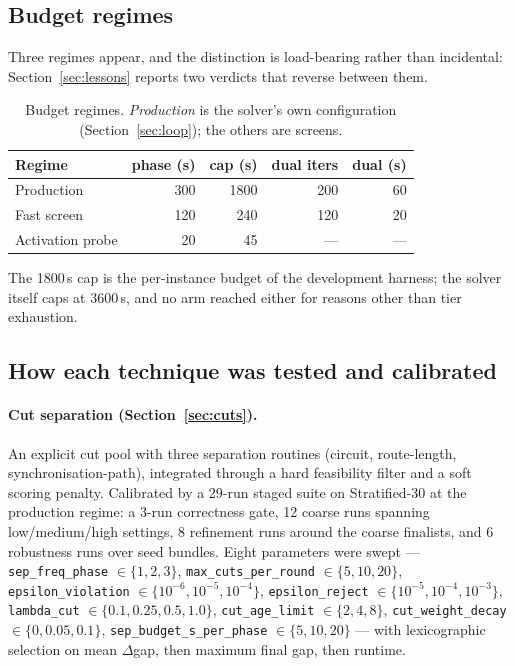 \documentclass[11pt,a4paper]{article}
\begin{document}
\subsection{Budget regimes}

Three regimes appear, and the distinction is load-bearing rather than incidental:
Section~\ref{sec:lessons} reports two verdicts that reverse between them.

\begin{table}[htbp]
\centering
\caption{Budget regimes. \emph{Production} is the solver's own configuration
(Section~\ref{sec:loop}); the others are screens.}
\label{tab:budgets}
\begin{tabular}{lrrrr}
\toprule
Regime & phase (s) & cap (s) & dual iters & dual (s) \\
\midrule
Production & 300 & 1800 & 200 & 60 \\
Fast screen & 120 & 240 & 120 & 20 \\
Activation probe & 20 & 45 & --- & --- \\
\bottomrule
\end{tabular}
\end{table}

The 1800\,s cap is the per-instance budget of the development harness; the solver
itself caps at 3600\,s, and no arm reached either for reasons other than tier
exhaustion.

\subsection{How each technique was tested and calibrated}

\paragraph{Cut separation (Section~\ref{sec:cuts}).}
An explicit cut pool with three separation routines (circuit, route-length,
synchronisation-path), integrated through a hard feasibility filter and a soft
scoring penalty. Calibrated by a 29-run staged suite on Stratified-30 at the
production regime: a 3-run correctness gate, 12 coarse runs spanning
low/medium/high settings, 8 refinement runs around the coarse finalists, and 6
robustness runs over seed bundles. Eight parameters were swept ---
\texttt{sep\_freq\_phase} $\in\{1,2,3\}$,
\texttt{max\_cuts\_per\_round} $\in\{5,10,20\}$,
\texttt{epsilon\_violation} $\in\{10^{-6},10^{-5},10^{-4}\}$,
\texttt{epsilon\_reject} $\in\{10^{-5},10^{-4},10^{-3}\}$,
\texttt{lambda\_cut} $\in\{0.1,0.25,0.5,1.0\}$,
\texttt{cut\_age\_limit} $\in\{2,4,8\}$,
\texttt{cut\_weight\_decay} $\in\{0,0.05,0.1\}$,
\texttt{sep\_budget\_s\_per\_phase} $\in\{5,10,20\}$ --- with lexicographic
selection on mean $\Delta$gap, then maximum final gap, then runtime.
\end{document}
